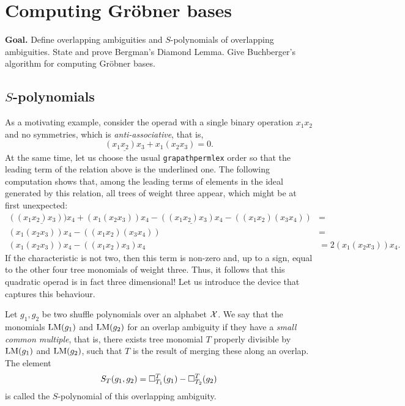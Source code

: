 \section{Computing Gr\"obner bases}\label{lecture:GB2}

\textbf{Goal.} 
Define overlapping ambiguities and $S$-polynomials of overlapping
ambiguities. State and prove Bergman's Diamond Lemma. 
Give Buchberger's algorithm for computing Gr\"obner bases.

\subsection{$S$-polynomials}

As a motivating example, consider the operad
with a single binary operation $x_1x_2$ and no
symmetries, which is \emph{anti-associative}, that is,
\[
\underline{(x_1x_2)x_3}+ x_1(x_2x_3)  = 0.
\] 
At the same time, let us choose the usual \texttt{grapathpermlex}
order so that the leading term of the relation above
is the underlined one. The following computation shows that,
among the leading terms of elements in the ideal
generated by this relation, all trees of weight three appear,
which might be at first unexpected:
\begin{align*}
\underline{((x_1x_2)x_3))x_4} + (x_1(x_2x_3))x_4 -
\underline{((x_1x_2)x_3)x_4}- ((x_1 x_2)(x_3x_4)) &=  \\
 (x_1(x_2x_3))x_4 - ((x_1 x_2)(x_3x_4)) &= \\
 (x_1(x_2x_3))x_4 - ((x_1 x_2)x_3)x_4 &=  2(x_1(x_2x_3))x_4.
\end{align*}
If the characteristic is not two, then this term is non-zero
and, up to a sign, equal to the other four tree monomials
of weight three. Thus, it follows that this quadratic operad
is in fact three dimensional! Let us introduce the device 
that captures this behaviour.

\begin{definition}
Let $g_1,g_2$ be two shuffle polynomials over an alphabet $\mathcal{X}$.
We say that the monomials $\operatorname{LM}(g_1)$ and $\operatorname{LM}(g_2)$ for
an overlap ambiguity if they have a \emph{small common multiple},
that is, there exists tree monomial $T$ properly divisible by  
$\operatorname{LM}(g_1)$ and $\operatorname{LM}(g_2)$, such that $T$ is the result
of merging these along an overlap. The element
\[
S_T(g_1,g_2) = 
\square_{T_1}^{T}(g_1) - \square_{T_2}^{T}(g_2)	
\]
is called the $S$-polynomial of this overlapping ambiguity.
\end{definition}

